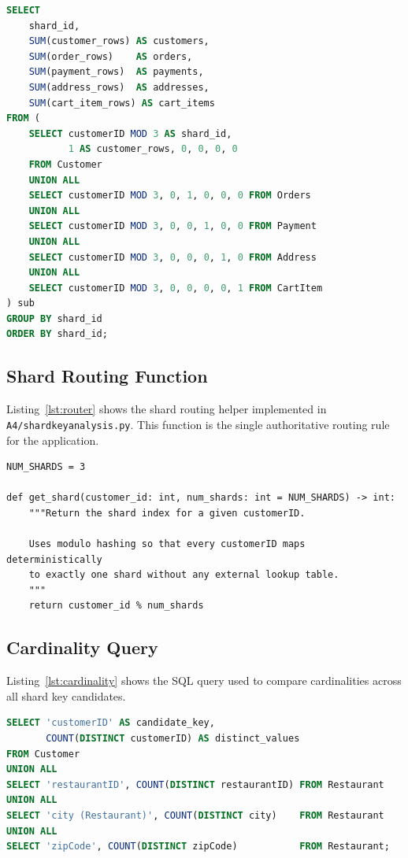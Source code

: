 \documentclass[12pt, a4paper]{article}
\renewcommand{\_}{\plainunderscore\allowbreak}
\begin{document}
\begin{lstlisting}[language=SQL, caption={Distribution verification query},
                   label={lst:distribution}]
SELECT
    shard_id,
    SUM(customer_rows) AS customers,
    SUM(order_rows)    AS orders,
    SUM(payment_rows)  AS payments,
    SUM(address_rows)  AS addresses,
    SUM(cart_item_rows) AS cart_items
FROM (
    SELECT customerID MOD 3 AS shard_id,
           1 AS customer_rows, 0, 0, 0, 0
    FROM Customer
    UNION ALL
    SELECT customerID MOD 3, 0, 1, 0, 0, 0 FROM Orders
    UNION ALL
    SELECT customerID MOD 3, 0, 0, 1, 0, 0 FROM Payment
    UNION ALL
    SELECT customerID MOD 3, 0, 0, 0, 1, 0 FROM Address
    UNION ALL
    SELECT customerID MOD 3, 0, 0, 0, 0, 1 FROM CartItem
) sub
GROUP BY shard_id
ORDER BY shard_id;
\end{lstlisting}

\subsection{Shard Routing Function}

Listing~\ref{lst:router} shows the shard routing helper implemented in
\texttt{A4/shard\_key\_analysis.py}. This function is the single
authoritative routing rule for the application.

\begin{lstlisting}[style=python, caption={Hash-based shard router},
                   label={lst:router}]
NUM_SHARDS = 3

def get_shard(customer_id: int, num_shards: int = NUM_SHARDS) -> int:
    """Return the shard index for a given customerID.

    Uses modulo hashing so that every customerID maps deterministically
    to exactly one shard without any external lookup table.
    """
    return customer_id % num_shards
\end{lstlisting}

\subsection{Cardinality Query}

Listing~\ref{lst:cardinality} shows the SQL query used to compare
cardinalities across all shard key candidates.

\begin{lstlisting}[language=SQL, caption={Candidate key cardinality survey},
                   label={lst:cardinality}]
SELECT 'customerID' AS candidate_key,
       COUNT(DISTINCT customerID) AS distinct_values
FROM Customer
UNION ALL
SELECT 'restaurantID', COUNT(DISTINCT restaurantID) FROM Restaurant
UNION ALL
SELECT 'city (Restaurant)', COUNT(DISTINCT city)    FROM Restaurant
UNION ALL
SELECT 'zipCode', COUNT(DISTINCT zipCode)           FROM Restaurant;
\end{lstlisting}
\end{document}
